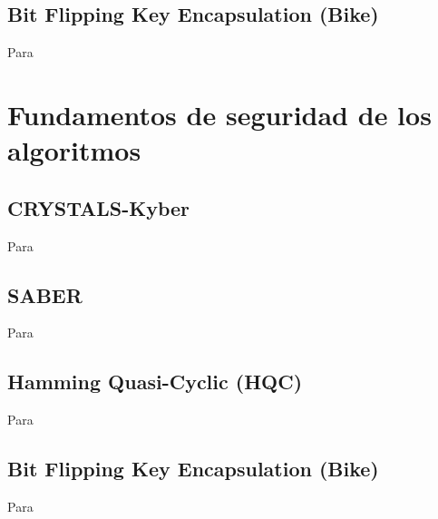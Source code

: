 \subsection{Bit Flipping Key Encapsulation (Bike)}
Para \cite{bike-spec-2022}
\newpage
\section{Fundamentos de seguridad de los algoritmos}
\subsection{CRYSTALS-Kyber }
Para \cite{kyber-spec-2021}
\subsection{SABER}
Para \cite{saber-spec-2020}
\subsection{Hamming Quasi-Cyclic (HQC)}
Para  \cite{hqc-spec-2022}
\subsection{Bit Flipping Key Encapsulation (Bike)}
Para \cite{bike-spec-2022}